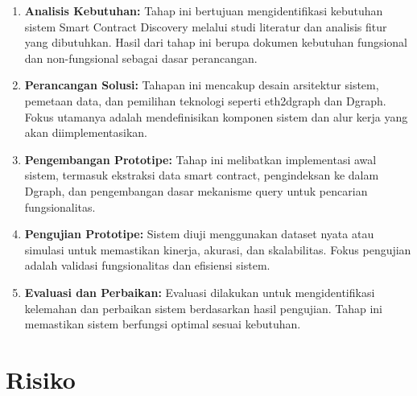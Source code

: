 \begin{enumerate}
	\item \textbf{Analisis Kebutuhan:} Tahap ini bertujuan mengidentifikasi kebutuhan sistem Smart Contract Discovery melalui studi literatur dan analisis fitur yang dibutuhkan. Hasil dari tahap ini berupa dokumen kebutuhan fungsional dan non-fungsional sebagai dasar perancangan.
	\item \textbf{Perancangan Solusi:} Tahapan ini mencakup desain arsitektur sistem, pemetaan data, dan pemilihan teknologi seperti eth2dgraph dan Dgraph. Fokus utamanya adalah mendefinisikan komponen sistem dan alur kerja yang akan diimplementasikan.
	\item \textbf{Pengembangan Prototipe:} Tahap ini melibatkan implementasi awal sistem, termasuk ekstraksi data smart contract, pengindeksan ke dalam Dgraph, dan pengembangan dasar mekanisme query untuk pencarian fungsionalitas.
	\item \textbf{Pengujian Prototipe:} Sistem diuji menggunakan dataset nyata atau simulasi untuk memastikan kinerja, akurasi, dan skalabilitas. Fokus pengujian adalah validasi fungsionalitas dan efisiensi sistem.
	\item \textbf{Evaluasi dan Perbaikan:} Evaluasi dilakukan untuk mengidentifikasi kelemahan dan perbaikan sistem berdasarkan hasil pengujian. Tahap ini memastikan sistem berfungsi optimal sesuai kebutuhan.
\end{enumerate}

\section{Risiko}
\label{sec:risiko}



